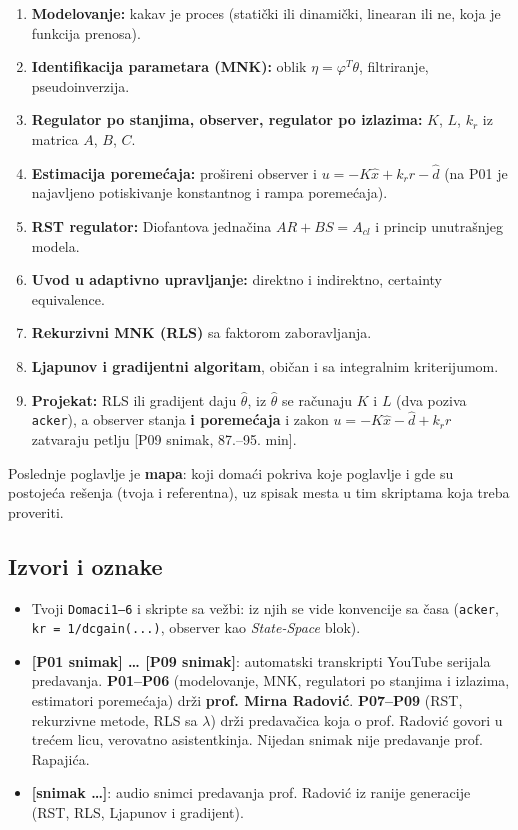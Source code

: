 \documentclass[11pt,a4paper,parskip=half,headsepline,numbers=noenddot]{scrartcl}
\DeclareRobustCommand{\izvor}[1]{{\small\color{izvorC}[#1]}}
\begin{document}
\begin{enumerate}
\def\labelenumi{\arabic{enumi}.}
\item \textbf{Modelovanje:} kakav je proces (statički ili dinamički, linearan ili ne, koja je funkcija prenosa).
\item \textbf{Identifikacija parametara (MNK):} oblik \(\eta = \varphi^T\theta\), filtriranje, pseudoinverzija.
\item \textbf{Regulator po stanjima, observer, regulator po izlazima:} \(K\), \(L\), \(k_r\) iz matrica \(A\), \(B\), \(C\).
\item \textbf{Estimacija poremećaja:} prošireni observer i \(u = -K\hat x + k_rr - \hat d\) (na P01 je najavljeno potiskivanje konstantnog i rampa poremećaja).
\item \textbf{RST regulator:} Diofantova jednačina \(AR + BS = A_{cl}\) i princip unutrašnjeg modela.
\item \textbf{Uvod u adaptivno upravljanje:} direktno i indirektno, certainty equivalence.
\item \textbf{Rekurzivni MNK (RLS)} sa faktorom zaboravljanja.
\item \textbf{Ljapunov i gradijentni algoritam}, običan i sa integralnim kriterijumom.
\item \textbf{Projekat:} RLS ili gradijent daju \(\hat\theta\), iz \(\hat\theta\) se računaju \(K\) i \(L\) (dva poziva \texttt{acker}), a observer stanja \textbf{i poremećaja} i zakon \(u = -K\hat x - \hat d + k_rr\) zatvaraju petlju \izvor{P09 snimak, 87.--95. min}.
\end{enumerate}

Poslednje poglavlje je \textbf{mapa}: koji domaći pokriva koje poglavlje i gde su postojeća rešenja (tvoja i referentna), uz spisak mesta u tim skriptama koja treba proveriti.

\subsection{Izvori i oznake}

\begin{itemize}
\item Tvoji \texttt{Domaci1–6} i skripte sa vežbi: iz njih se vide konvencije sa časa (\texttt{acker}, \texttt{kr\ =\ 1/\allowbreak{}dcgain(\allowbreak{}...)}, observer kao \emph{State-Space} blok).
\item \textbf{\izvor{P01 snimak} \ldots{} \izvor{P09 snimak}}: automatski transkripti YouTube serijala predavanja. \textbf{P01--P06} (modelovanje, MNK, regulatori po stanjima i izlazima, estimatori poremećaja) drži \textbf{prof. Mirna Radović}. \textbf{P07--P09} (RST, rekurzivne metode, RLS sa \(\lambda\)) drži predavačica koja o prof. Radović govori u trećem licu, verovatno asistentkinja. Nijedan snimak nije predavanje prof. Rapajića.
\item \textbf{\izvor{snimak \ldots{}}}: audio snimci predavanja prof. Radović iz ranije generacije (RST, RLS, Ljapunov i gradijent).
\end{itemize}
\end{document}
